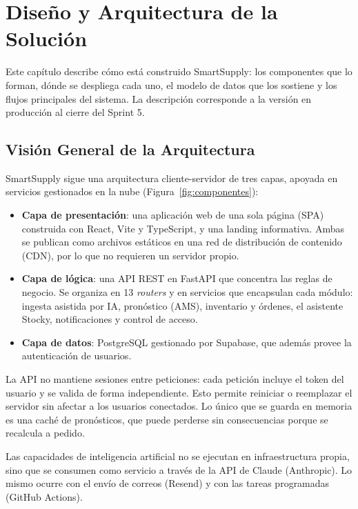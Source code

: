 \documentclass[12pt, a4paper]{report}
\begin{document}
\chapter{Diseño y Arquitectura de la Solución}

Este capítulo describe cómo está construido SmartSupply: los componentes que lo forman,
dónde se despliega cada uno, el modelo de datos que los sostiene y los flujos principales
del sistema. La descripción corresponde a la versión en producción al cierre del Sprint 5.

\section{Visión General de la Arquitectura}

SmartSupply sigue una arquitectura cliente-servidor de tres capas, apoyada en servicios
gestionados en la nube (Figura~\ref{fig:componentes}):

\begin{itemize}
  \item \textbf{Capa de presentación}: una aplicación web de una sola página (SPA)
        construida con React, Vite y TypeScript, y una landing informativa. Ambas se
        publican como archivos estáticos en una red de distribución de contenido (CDN),
        por lo que no requieren un servidor propio.
  \item \textbf{Capa de lógica}: una API REST en FastAPI que concentra las reglas de
        negocio. Se organiza en 13 \textit{routers} y en servicios que encapsulan cada
        módulo: ingesta asistida por IA, pronóstico (AMS), inventario y órdenes, el
        asistente Stocky, notificaciones y control de acceso.
  \item \textbf{Capa de datos}: PostgreSQL gestionado por Supabase, que además provee la
        autenticación de usuarios.
\end{itemize}

La API no mantiene sesiones entre peticiones: cada petición incluye el token del usuario y
se valida de forma independiente. Esto permite reiniciar o reemplazar el servidor sin
afectar a los usuarios conectados. Lo único que se guarda en memoria es una caché de
pronósticos, que puede perderse sin consecuencias porque se recalcula a pedido.

Las capacidades de inteligencia artificial no se ejecutan en infraestructura propia, sino
que se consumen como servicio a través de la API de Claude (Anthropic). Lo mismo ocurre con
el envío de correos (Resend) y con las tareas programadas (GitHub Actions).
\end{document}
